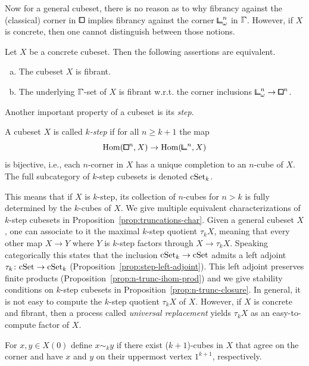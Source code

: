Now for a general cubeset, there is no reason as to why fibrancy against the (classical) corner in $\bbox$ implies fibrancy against the corner ${\bbcor}^n_\omega$ in $\bbGamma$.
However, if $X$ is concrete, then one cannot distinguish between those notions.

\begin{proposition*}
Let $X$ be a concrete cubeset.
Then the following assertions are equivalent.
\begin{enumerate}[(a)]
    \item The cubeset $X$ is fibrant.
    \item The underlying $\bbGamma$-set of $X$ is fibrant w.r.t. the corner inclusions
            ${\bbcor}^n_\omega\to{\bblox}^n$.
\end{enumerate}
\end{proposition*}

Another important property of a cubeset is its \emph{step}.

\begin{definition*}
A cubeset $X$ is called \emph{$k$-step} if for all $n\geq k+1$ the map
\[
    \hom({\bbox}^n, X) \to \hom({\bbcor}^n, X)
\]
is bijective, i.e., each $n$-corner in $X$ has a unique completion to an $n$-cube of $X$.
The full subcategory of $k$-step cubesets is denoted $\mathrm{cSet}_k$.
\end{definition*}

This means that if $X$ is $k$-step, its collection of $n$-cubes for $n>k$ is fully determined
by the $k$-cubes of $X$.
We give multiple equivalent characterizations of $k$-step cubesets in Proposition~\ref{prop:truncations-char}.
Given a general cubeset $X$, one can associate to it the maximal $k$-step quotient $\tau_k X$,
meaning that every other map $X\to Y$ where $Y$ is $k$-step factors through $X\to \tau_k X$.
Speaking categorically this states that the inclusion $\mathrm{cSet}_k\to\mathrm{cSet}$ admits a left adjoint
$\tau_k\colon\mathrm{cSet}\to\mathrm{cSet}_k$ (Proposition~\ref{prop:step-left-adjoint}).
This left adjoint preserves finite products (Proposition~\ref{prop:n-trunc-ihom-prod})
and we give stability conditions on $k$-step cubesets in Proposition~\ref{prop:n-trunc-closure}.
In general, it is not easy to compute the $k$-step quotient $\tau_k X$ of $X$.
However, if $X$ is concrete and fibrant, then a process called \emph{universal replacement}
yields $\tau_k X$ as an easy-to-compute factor of $X$.

\begin{definition*}
For $x,y\in X(0)$ define $x\sim_k y$ if there exist ($k+1$)-cubes in $X$ that agree on the corner and have $x$ and $y$ on their uppermost vertex $1^{k+1}$, respectively.
\end{definition*}

